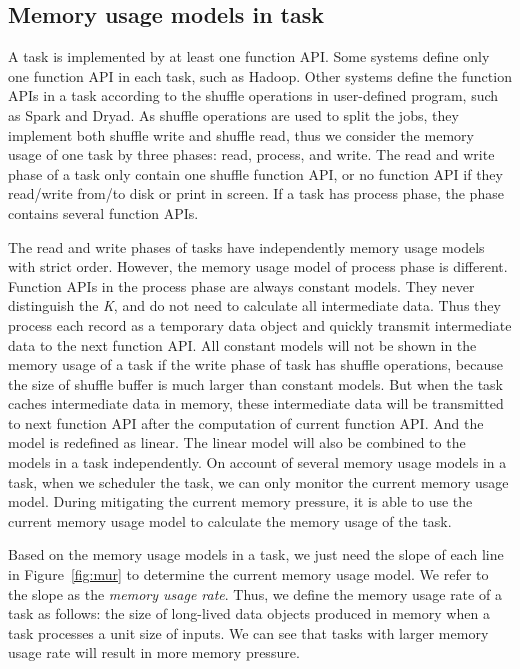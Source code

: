 \subsection{Memory usage models in task}
\label{subsec:taskmodel}

A task is implemented by at least one function API. Some systems define only one function API in each task, such as Hadoop. Other systems define the function APIs in a task according to the shuffle operations in user-defined program, such as Spark and Dryad. As shuffle operations are used to split the jobs, they implement both shuffle write and shuffle read, thus we consider the memory usage of one task by three phases: read, process, and write. The read and write phase of a task only contain one shuffle function API, or no function API if they read/write from/to disk or print in screen. If a task has process phase, the phase contains several function APIs. 

The read and write phases of tasks have independently memory usage models with strict order. However, the memory usage model of process phase is different. Function APIs in the process phase are always constant models. They never distinguish the \textit{K}, and do not need to calculate all intermediate data. Thus they process each record as a temporary data object and quickly transmit intermediate data to the next function API. All constant models will not be shown in the memory usage of a task if the write phase of task has shuffle operations, because the size of shuffle buffer is much larger than constant models. But when the task caches intermediate data in memory, these intermediate data will be transmitted to next function API after the computation of current function API. And the model is redefined as linear. The linear model will also be combined to the models in a task independently. On account of several memory usage models in a task, when we scheduler the task, we can only monitor the current memory usage model. During mitigating the current memory pressure, it is able to use the current memory usage model to calculate the memory usage of the task.

Based on the memory usage models in a task, we just need the slope of each line in Figure~\ref{fig:mur} to determine the current memory usage model. We refer to the slope as the \textit{memory usage rate}. Thus, we define the memory usage rate of a task as follows: the size of long-lived data objects produced in memory when a task processes a unit size of inputs. We can see that tasks with larger memory usage rate will result in more memory pressure.

